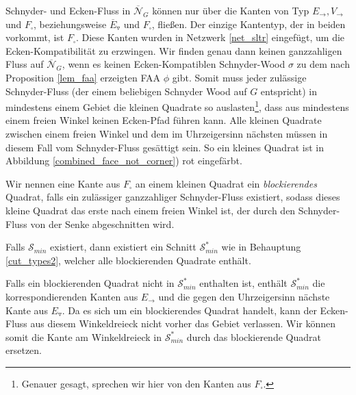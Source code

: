 Schnyder- und Ecken-Fluss in $\overline{\mathcal{N}}_G$ können nur über die Kanten von Typ $E_\to, V_\to$ und $F_\square$, beziehungsweise $\overline{E}_\triangledown$ und $F_\square$, fließen. Der einzige Kantentyp, der in beiden vorkommt, ist $F_\square$. Diese Kanten wurden in Netzwerk \ref{net_sltr} eingefügt, um die Ecken-Kompatibilität zu erzwingen. Wir finden genau dann keinen ganzzahligen Fluss auf $\overline{\mathcal{N}}_G$, wenn es keinen Ecken-Kompatiblen Schnyder-Wood $\sigma$ zu dem nach Proposition \ref{lem_faa} erzeigten FAA $\phi$ gibt. Somit muss jeder zulässige Schnyder-Fluss (der einem beliebigen Schnyder Wood auf $G$ entspricht) in mindestens einem Gebiet die kleinen Quadrate so auslasten\footnote{Genauer gesagt, sprechen wir hier von den Kanten aus $F_\square$.}, dass aus mindestens einem freien Winkel keinen Ecken-Pfad führen kann. Alle kleinen Quadrate zwischen einem freien Winkel und dem im Uhrzeigersinn nächsten müssen in diesem Fall vom Schnyder-Fluss gesättigt sein. So ein kleines Quadrat ist in Abbildung \ref{combined_face_not_corner}) rot eingefärbt. 

Wir nennen eine Kante aus $F_\square$ an einem kleinen Quadrat ein \textit{blockierendes} Quadrat, falls ein zulässiger ganzzahliger Schnyder-Fluss existiert, sodass dieses kleine Quadrat das erste nach einem freien Winkel ist, der durch den Schnyder-Fluss von der Senke abgeschnitten wird.

\begin{claim}
Falls $\mathcal{S}_{min}$ existiert, dann existiert ein Schnitt $\mathcal{S}^*_{min}$ wie in Behauptung \ref{cut_types2}, welcher alle blockierenden Quadrate enthält.
\end{claim}

Falls ein blockierenden Quadrat nicht in $\mathcal{S}^*_{min}$ enthalten ist, enthält $\mathcal{S}^*_{min}$ die korrespondierenden Kanten aus $E_\to$ und die gegen den Uhrzeigersinn nächste Kante aus $E_\triangledown$. Da es sich um ein blockierendes Quadrat handelt, kann der Ecken-Fluss aus diesem Winkeldreieck nicht vorher das Gebiet verlassen. Wir können somit die Kante am Winkeldreieck in $\mathcal{S}^*_{min}$ durch das blockierende Quadrat ersetzen. \\


